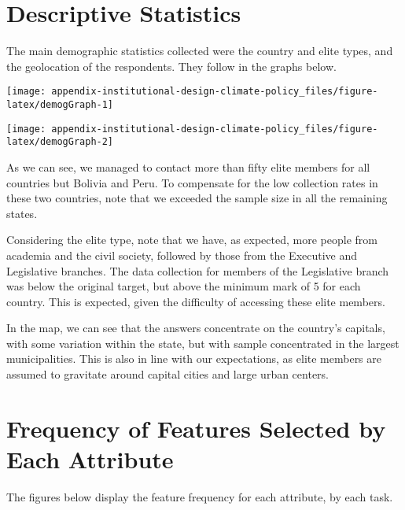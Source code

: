 \documentclass[12pt,a4paper,]{article}
\begin{document}
\hypertarget{descriptive-statistics}{%
\section{\texorpdfstring{Descriptive Statistics
\label{sec:descstats}}{Descriptive Statistics }}\label{descriptive-statistics}}

The main demographic statistics collected were the country and elite
types, and the geolocation of the respondents. They follow in the graphs
below.

\begin{center}\texttt{[image: appendix-institutional-design-climate-policy\_files/figure-latex/demogGraph-1]} \end{center}

\begin{center}\texttt{[image: appendix-institutional-design-climate-policy\_files/figure-latex/demogGraph-2]} \end{center}

As we can see, we managed to contact more than fifty elite members for
all countries but Bolivia and Peru. To compensate for the low collection
rates in these two countries, note that we exceeded the sample size in
all the remaining states.

Considering the elite type, note that we have, as expected, more people
from academia and the civil society, followed by those from the
Executive and Legislative branches. The data collection for members of
the Legislative branch was below the original target, but above the
minimum mark of 5 for each country. This is expected, given the
difficulty of accessing these elite members.

In the map, we can see that the answers concentrate on the country's
capitals, with some variation within the state, but with sample
concentrated in the largest municipalities. This is also in line with
our expectations, as elite members are assumed to gravitate around
capital cities and large urban centers.

\hypertarget{frequency-of-features-selected-by-each-attribute}{%
\section{\texorpdfstring{Frequency of Features Selected by Each
Attribute
\label{sec:features}}{Frequency of Features Selected by Each Attribute }}\label{frequency-of-features-selected-by-each-attribute}}

The figures below display the feature frequency for each attribute, by
each task.
\end{document}
